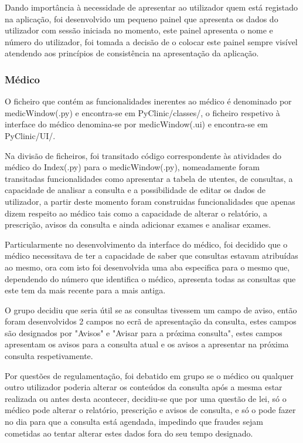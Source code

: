\documentclass[11pt,a4paper,twoside]{report}
\begin{document}
	Dando importância à necessidade de apresentar ao utilizador quem está registado na aplicação, foi desenvolvido um pequeno painel que apresenta os dados do utilizador com sessão iniciada no momento, este painel apresenta o nome e número do utilizador, foi tomada a decisão de o colocar este painel sempre visível atendendo aos princípios de consistência na apresentação da aplicação.
	
	\subsubsection{Médico}
	O ficheiro que contém as funcionalidades inerentes ao médico é denominado por medicWindow(.py) e encontra-se em PyClinic/classes/, o ficheiro respetivo à interface do médico denomina-se por medicWindow(.ui) e encontra-se em PyClinic/UI/.
	
	Na divisão de ficheiros, foi transitado código correspondente às atividades do médico do Index(.py) para o medicWindow(.py), nomeadamente foram transitadas funcionalidades como apresentar a tabela de utentes, de 
	consultas, a capacidade de analisar a consulta e a possibilidade de editar os dados de utilizador, a partir deste momento foram construidas funcionalidades que apenas dizem respeito ao médico tais como a capacidade de alterar o relatório, a prescrição, avisos da consulta e ainda adicionar exames e analisar exames.
	
	Particularmente no desenvolvimento da interface do médico, foi decidido que o médico necessitava de ter a capacidade de saber que consultas estavam atribuídas ao mesmo, ora com isto foi desenvolvida uma aba especifica para o mesmo que, dependendo do número que identifica o médico, apresenta todas as consultas que este tem da mais recente para a mais antiga.
	
	O grupo decidiu que seria útil se as consultas tivessem um campo de aviso, então foram desenvolvidos 2 campos no ecrã de apresentação da consulta, estes campos são designados por "Avisos" e "Avisar para a próxima consulta", estes campos apresentam os avisos para a consulta atual e os avisos a apresentar na próxima consulta respetivamente.
	
	Por questões de regulamentação, foi debatido em grupo se o médico ou qualquer outro utilizador poderia alterar os conteúdos da consulta após a mesma estar realizada ou antes desta acontecer, decidiu-se que por uma questão de lei, só o médico pode alterar o relatório, prescrição e avisos de consulta, e só o pode fazer no dia para que a consulta está agendada, impedindo que fraudes sejam cometidas ao tentar alterar estes dados fora do seu tempo designado.
	
\end{document}
